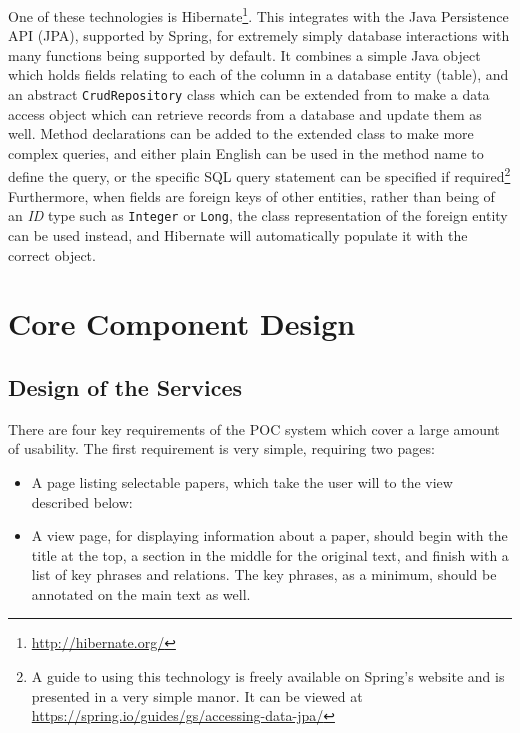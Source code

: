 One of these technologies is Hibernate\footnote{\href{http://hibernate.org/}{http://hibernate.org/}}. This integrates with the Java Persistence API (JPA), supported by Spring, for extremely simply database interactions with many functions being supported by default. It combines a simple Java object which holds fields relating to each of the column in a database entity (table), and an abstract \texttt{CrudRepository} class which can be extended from to make a data access object which can retrieve records from a database and update them as well. Method declarations can be added to the extended class to make more complex queries, and either plain English can be used in the method name to define the query, or the specific SQL query statement can be specified if required\footnote{A guide to using this technology is freely available on Spring's website and is presented in a very simple manor. It can be viewed at \href{https://spring.io/guides/gs/accessing-data-jpa/}{https://spring.io/guides/gs/accessing-data-jpa/}} Furthermore, when fields are foreign keys of other entities, rather than being of an \textit{ID} type such as \texttt{Integer} or \texttt{Long}, the class representation of the foreign entity can be used instead, and Hibernate will automatically populate it with the correct object.

\section{Core Component Design}

\subsection*{Design of the Services}
There are four key requirements of the POC system which cover a large amount of usability. The first requirement is very simple, requiring two pages:
\begin{itemize}
	\item A page listing selectable papers, which take the user will to the view described below:
	\item A view page, for displaying information about a paper, should begin with the title at the top, a section in the middle for the original text, and finish with a list of key phrases and relations. The key phrases, as a minimum, should be annotated on the main text as well.
\end{itemize}

